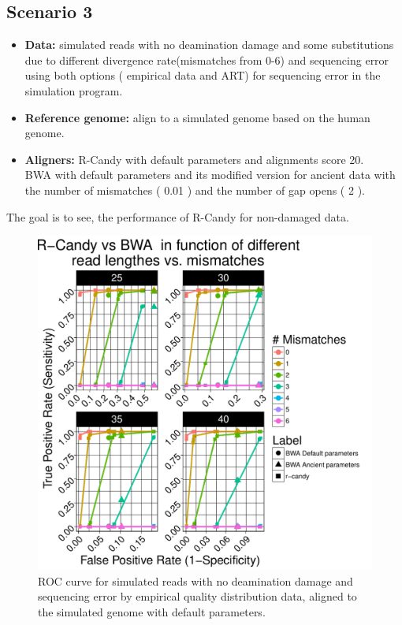 \documentclass[11pt,a4paper]{report}
\begin{document}

\subsection{Scenario 3}
 
  \begin{itemize}

   \item \textbf{Data:} simulated reads with no deamination damage
and some substitutions due to different divergence rate(mismatches 
from 0-6) and sequencing error using both options ( empirical data 
and ART) for sequencing error in the simulation program.
   
   \item \textbf{Reference genome:} align to a simulated genome based
 on the human genome.

    \item \textbf{Aligners:} 
R-Candy with default parameters and alignments score 20. \\
BWA with default parameters and its modified version for ancient
data with the number of mismatches ( 0.01 ) and the number of gap opens ( 2 ).

  \end{itemize}
 
The goal is to see, the performance of R-Candy for non-damaged data.

\begin{figure}[H]
\centering
\includegraphics[width=12cm]{pictures/bROC_DS3_emp.pdf}
\caption{ROC curve for simulated reads with no deamination damage and sequencing 
error by empirical quality distribution data, aligned to the simulated genome
         with default parameters.}
\label{DS3_emp}
\end{figure}
\end{document}
